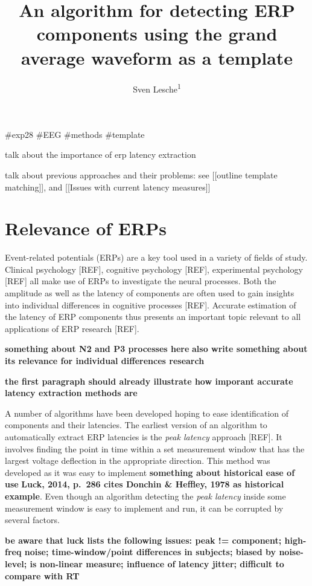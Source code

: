 \documentclass[
  man,floatsintext]{apa7}
\title{An algorithm for detecting ERP components using the grand average waveform as a template}
\author{Sven Lesche\textsuperscript{1}}
\date{}
\affiliation{\vspace{0.5cm}\textsuperscript{1} Ruprecht-Karls-University Heidelberg}
\begin{document}
\maketitle

\#exp28 \#EEG \#methods \#template

talk about the importance of erp latency extraction

talk about previous approaches and their problems: see {[}{[}outline template matching{]}{]}, and {[}{[}Issues with current latency measures{]}{]}

\hypertarget{relevance-of-erps}{%
\section{Relevance of ERPs}\label{relevance-of-erps}}

Event-related potentials (ERPs) are a key tool used in a variety of fields of study. Clinical psychology {[}REF{]}, cognitive psychology {[}REF{]}, experimental psychology {[}REF{]} all make use of ERPs to investigate the neural processes. Both the amplitude as well as the latency of components are often used to gain insights into individual differences in cognitive processes {[}REF{]}. Accurate estimation of the latency of ERP components thus presents an important topic relevant to all applications of ERP research {[}REF{]}.

\textbf{something about N2 and P3 processes here} \textbf{also write something about its relevance for individual differences research}

\textbf{the first paragraph should already illustrate how imporant accurate latency extraction methods are}

A number of algorithms have been developed hoping to ease identification of components and their latencies. The earliest version of an algorithm to automatically extract ERP latencies is the \emph{peak latency} approach {[}REF{]}. It involves finding the point in time within a set measurement window that has the largest voltage deflection in the appropriate direction. This method was developed as it was easy to implement \textbf{something about historical ease of use} \textbf{Luck, 2014, p.~286 cites Donchin \& Heffley, 1978 as historical example}. Even though an algorithm detecting the \emph{peak latency} inside some measurement window is easy to implement and run, it can be corrupted by several factors.

\textbf{be aware that luck lists the following issues: peak != component; high-freq noise; time-window/point differences in subjects; biased by noise-level; is non-linear measure; influence of latency jitter; difficult to compare with RT}
\end{document}
